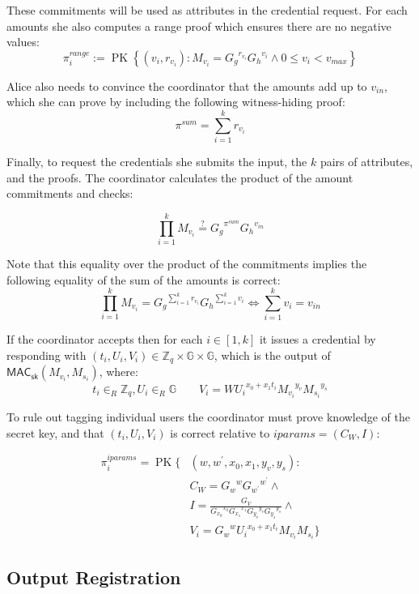 \documentclass{article}
\begin{document}
These commitments will be used as attributes in the credential request. For each amounts she also computes a range proof which ensures there are no negative values:
\[
\pi^{\mathit{range}}_i := \operatorname{PK}\left\{\left(v_i, r_{v_i} \right) :
M_{v_i} = {G_g}^{r_{v_i}}{G_h}^{v_i}
\land
0 \leq v_i < v_{\mathit{max}} \right\}
\]

Alice also needs to convince the coordinator that the amounts add up to $v_{\mathit{in}}$, which she can prove by including the following witness-hiding proof:
\[ \pi^{\mathit{sum}}=\sum_{i=1}^{k} r_{v_i} \]

Finally, to request the credentials she submits the input, the $k$ pairs of attributes, and the proofs. The coordinator calculates the product of the amount commitments and checks:

\[ \prod_{i=1}^{k} M_{v_i}
\stackrel{?}{=}
{G_g}^{\pi^{\mathit{sum}}}{G_h}^{v_{\mathit{in}}}
\]

Note that this equality over the product of the commitments implies the following  equality of the sum of the amounts is correct:
\[\prod_{i=1}^{k} M_{v_i}
= {G_g}^{\sum_{i=1}^{k} r_{v_i}} {G_h}^{\sum_{i=1}^{k} v_i} 
\iff
\sum_{i=1}^{k} v_i = v_{\mathit{in}}
\]

If the coordinator accepts then for each $i \in [1,k]$ it issues a credential by responding with
$(t_i, U_i, V_i) \in \mathbb{Z}_q \times \mathbb{G} \times \mathbb{G}$,
which is the output of
$\mathsf{MAC}_{\mathsf{sk}}(M_{v_i}, M_{s_i})$,
where:
\[
t_i \in_{R} \mathbb{Z}_{q}, U_i \in_{R} \mathbb{G}
\qquad
V_i=W {U_i}^{x_{0}+x_{1} t_i}{M_{v_i}}^{y_v} {M_{s_i}}^{y_s}
\]

To rule out tagging individual users the coordinator must prove knowledge of the secret key, and that $(t_i, U_i, V_i)$ is correct relative to $\mathit{iparams}=(C_{W}, I)$:

\begin{align*}
\pi_{i}^{\mathit{iparams}}=\operatorname{PK}\{ & (w, w^{\prime}, x_{0}, x_{1}, y_v, y_s): \\
&C_{W}={G_{w}}^{w} {G_{w^{\prime}}}^{w^\prime} \land \\
&I=\frac{G_{V}}{{G_{x_{0}}}^{x_0} {G_{x_1}}^{x_1} {G_{y_v}}^{y_v} {G_{y_s}}^{y_s}} \land \\
&V_i={G_w}^{w}{U_i}^{x_{0}+x_{1}t_i} M_{v_i} M_{s_i}
\}
\end{align*}


\subsection{Output Registration}
\end{document}
